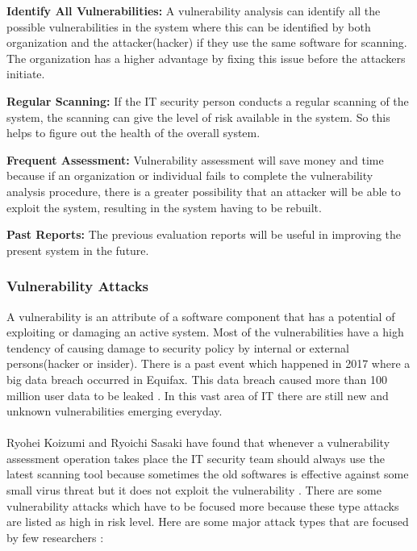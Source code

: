 \textbf{Identify All Vulnerabilities:} A vulnerability analysis can identify all the possible vulnerabilities in the system where this can be identified by both organization and the attacker(hacker) if they use the same software for scanning. The organization has a higher advantage by fixing this issue before the attackers initiate. 
	
\textbf{Regular Scanning:} If the IT security person conducts a regular scanning of the system, the scanning can give the level of risk available in the system. So this helps to figure out the health of the overall system.
	
\textbf{Frequent Assessment: } Vulnerability assessment will save money and time because if an organization or individual fails to complete the vulnerability analysis procedure, there is a greater possibility that an attacker will be able to exploit the system, resulting in the system having to be rebuilt.
	
\textbf{Past Reports:} The previous evaluation reports will be useful in improving the present system in the future.

\subsubsection{Vulnerability Attacks}
A vulnerability is an attribute of a software component that has a potential of exploiting or damaging an active system. Most of the vulnerabilities have a high tendency of causing damage to security policy by internal or external persons(hacker or insider). There is a past event which happened in 2017 where a big data breach occurred in Equifax. This data breach caused more than 100 million user data to be leaked \cite{Gilad}. In this vast area of IT there are still new and unknown vulnerabilities emerging everyday.
\paragraph{}
Ryohei Koizumi and Ryoichi Sasaki have found that whenever a vulnerability assessment operation takes place the IT security team should always use the latest scanning tool because sometimes the old softwares is effective against some small virus threat but it does not exploit the vulnerability \cite{KoSa2015}. There are some vulnerability attacks which have to be focused more because these type attacks are listed as high in risk level. Here are some major attack types that are focused by few researchers \cite{AlAl2015}:

